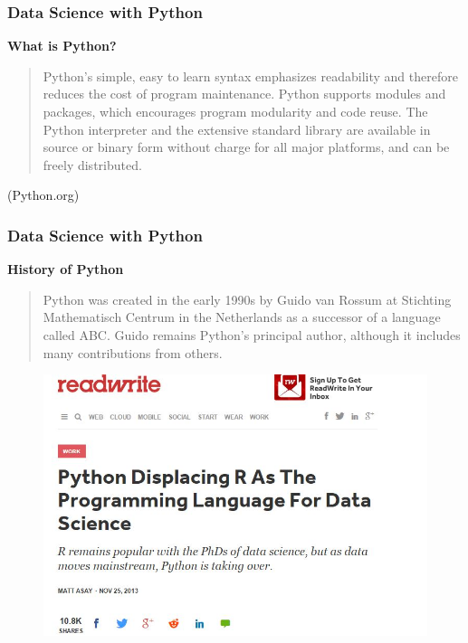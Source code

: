 \documentclass{beamer}
\begin{document}
\begin{frame}
		\frametitle{Data Science with Python}
	\Large
	\textbf{What is Python?}
	\begin{quote}
		Python's simple, easy to learn syntax emphasizes readability and therefore reduces the cost of program maintenance. Python supports modules and packages, which encourages program modularity and code reuse. The Python interpreter and the extensive standard library are available in source or binary form without charge for all major platforms, and can be freely distributed.
	\end{quote}
	(Python.org)
\end{frame}
\begin{frame}
		\frametitle{Data Science with Python}
	\Large
	\textbf{History of Python}
	\begin{quote}
		Python was created in the early 1990s by Guido van Rossum at Stichting Mathematisch Centrum in the Netherlands as a successor of a language called ABC. Guido remains Python’s principal author, although it includes many contributions from others.
	\end{quote}
\end{frame}
\begin{frame}
	\begin{figure}
\centering
\includegraphics[width=1.1\linewidth]{mjasay}

\end{figure}

\end{frame}
\end{document}
